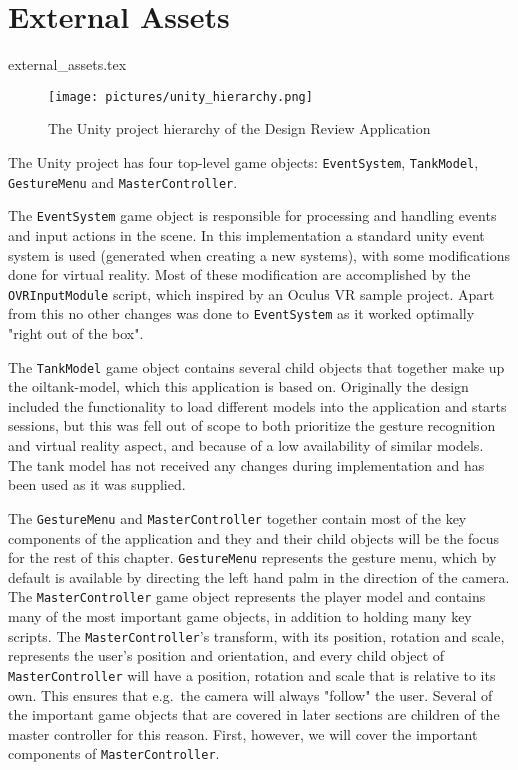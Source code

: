 
\section{External Assets}
{external_assets.tex}

\begin{figure}%
	\texttt{[image: pictures/unity\_hierarchy.png]} %
	\caption[The Unity project hierarchy of the Design Review Application]{The Unity project hierarchy of the Design Review Application}
	\label{fig:unity_hierarchy}
\end{figure} 

The Unity project has four top-level game objects: \texttt{EventSystem}, \texttt{TankModel}, \texttt{GestureMenu} and \texttt{MasterController}. 

The \texttt{EventSystem} game object is responsible for processing and handling events and input actions in the scene. 
In this implementation a standard unity event system is used (generated when creating a new systems), with some modifications done for virtual reality.
Most of these modification are accomplished by the \texttt{OVRInputModule} script, which inspired by an Oculus VR sample project. 
Apart from this no other changes was done to \texttt{EventSystem} as it worked optimally "right out of the box".

The \texttt{TankModel} game object contains several child objects that together make up the oiltank-model, which this application is based on.
Originally the design included the functionality to load different models into the application and starts sessions, but 
this was fell out of scope to both prioritize the gesture recognition and virtual reality aspect, and because of a low availability of similar models.
The tank model has not received any changes during implementation and has been used as it was supplied. 

The \texttt{GestureMenu} and \texttt{MasterController} together contain most of the key components of the application and they and their child objects will
be the focus for the rest of this chapter. \texttt{GestureMenu} represents the gesture menu, which by default is available by directing the left hand palm in the 
direction of the camera. The \texttt{MasterController} game object represents the player model and contains many of the most important game objects, in addition to
holding many key scripts. The \texttt{MasterController}'s transform, with its position, rotation and scale, represents the user's position and orientation, 
and every child object of \texttt{MasterController} will have a position, rotation and scale that is relative to its own. This ensures
that e.g.~the camera will always "follow" the user. Several of the important game objects that are covered in later sections are children of 
the master controller for this reason. First, however, we will cover the important components of \texttt{MasterController}.

